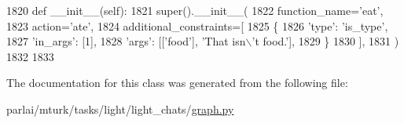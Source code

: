\begin{DoxyCode}
1820     \textcolor{keyword}{def }\_\_init\_\_(self):
1821         super().\_\_init\_\_(
1822             function\_name=\textcolor{stringliteral}{'eat'},
1823             action=\textcolor{stringliteral}{'ate'},
1824             additional\_constraints=[
1825                 \{
1826                     \textcolor{stringliteral}{'type'}: \textcolor{stringliteral}{'is\_type'},
1827                     \textcolor{stringliteral}{'in\_args'}: [1],
1828                     \textcolor{stringliteral}{'args'}: [[\textcolor{stringliteral}{'food'}], \textcolor{stringliteral}{'That isn\(\backslash\)'t food.'}],
1829                 \}
1830             ],
1831         )
1832 
1833 
\end{DoxyCode}


The documentation for this class was generated from the following file\+:\begin{DoxyCompactItemize}
\item 
parlai/mturk/tasks/light/light\+\_\+chats/\hyperlink{parlai_2mturk_2tasks_2light_2light__chats_2graph_8py}{graph.\+py}\end{DoxyCompactItemize}
